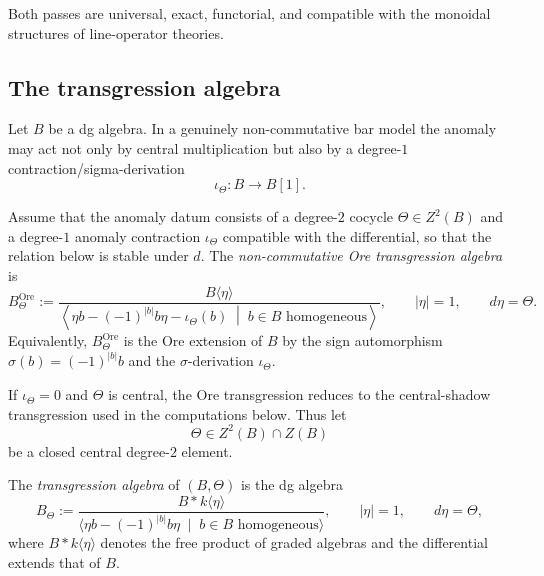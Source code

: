 Both passes are universal, exact, functorial, and compatible with the monoidal structures of line-operator theories.

\subsection{The transgression algebra}
\label{subsec:tholog-transgression-algebra}

Let \(B\) be a dg algebra. In a genuinely non-commutative bar model the
anomaly may act not only by central multiplication but also by a
degree-\(1\) contraction/sigma-derivation
\[
\iota_{\Theta}\colon B\longrightarrow B[1].
\]

\begin{definition}
\label{def:tholog-ore-transgression-contraction}
Assume that the anomaly datum consists of a degree-\(2\) cocycle
\(\Theta\in Z^{2}(B)\) and a degree-\(1\) anomaly contraction
\(\iota_{\Theta}\) compatible with the differential, so that the
relation below is stable under \(d\). The \emph{non-commutative Ore
transgression algebra} is
\begin{equation}
\label{eq:tholog-ore-transgression-contraction}
B_{\Theta}^{\mathrm{Ore}}
:=
\frac{B\langle \eta\rangle}
{\left\langle
\eta b-(-1)^{|b|}b\eta-\iota_{\Theta}(b)
\;\middle|\; b\in B \text{ homogeneous}
\right\rangle},
\qquad |\eta|=1,\qquad d\eta=\Theta.
\end{equation}
Equivalently, \(B_{\Theta}^{\mathrm{Ore}}\) is the Ore extension of
\(B\) by the sign automorphism \(\sigma(b)=(-1)^{|b|}b\) and the
\(\sigma\)-derivation \(\iota_{\Theta}\).
\end{definition}

If \(\iota_{\Theta}=0\) and \(\Theta\) is central, the Ore
transgression reduces to the central-shadow transgression used in the
computations below. Thus let
\[
\Theta\in Z^{2}(B)\cap Z(B)
\]
be a closed central degree-\(2\) element.

\begin{definition}
\label{def:tholog-transgression-algebra}
The \emph{transgression algebra} of \((B,\Theta)\) is the dg algebra
\[
B_{\Theta}
:=
\frac{B * k\langle \eta\rangle}
{\langle \eta b-(-1)^{|b|}b\eta\;\mid\; b\in B \text{ homogeneous}\rangle},
\qquad |\eta|=1,\qquad d\eta=\Theta,
\]
where \(B * k\langle\eta\rangle\) denotes the free product of graded algebras and the differential extends that of \(B\).
\end{definition}

